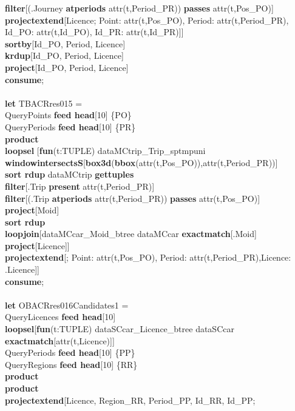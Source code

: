 \documentclass[a4paper]{article}
\newcommand{\op}[1]{\textbf{#1}}
\begin{document}
\begin{scriptsize}
\begin{tabbing}
\>\>\op{filter}[(.Journey \op{atperiods} attr(t,Period\_PR)) \op{passes} attr(t,Pos\_PO)]\\
\>\>\op{projectextend}[Licence; Point: attr(t,Pos\_PO), Period: attr(t,Period\_PR), Id\_PO: attr(t,Id\_PO), Id\_PR: attr(t,Id\_PR)]]\\
\>\op{sortby}[Id\_PO, Period, Licence]\\
\>\op{krdup}[Id\_PO, Period, Licence]\\
\>\op{project}[Id\_PO, Period, Licence]\\
\op{consume};\\
\\
\op{let} TBACRres015 =\\
\>QueryPoints  \op{feed head}[10] \{PO\}\\
\>QueryPeriods \op{feed head}[10] \{PR\}\\
\>\op{product}\\
\>\op{loopsel} [\op{fun}(t:TUPLE) dataMCtrip\_Trip\_sptmpuni \op{windowintersectsS}[\op{box3d}(\op{bbox}(attr(t,Pos\_PO)),attr(t,Period\_PR))]\\
\>\>\op{sort rdup} dataMCtrip \op{gettuples}\\
\>\>\op{filter}[.Trip \op{present} attr(t,Period\_PR)]\\
\>\>\op{filter}[(.Trip \op{atperiods} attr(t,Period\_PR)) \op{passes} attr(t,Pos\_PO)]\\
\>\>\op{project}[Moid]\\
\>\>\op{sort rdup}\\
\>\>\op{loopjoin}[dataMCcar\_Moid\_btree dataMCcar \op{exactmatch}[.Moid] \op{project}[Licence]]\\
\>\>\op{projectextend}[; Point: attr(t,Pos\_PO), Period: attr(t,Period\_PR),Licence: .Licence]]\\
\op{consume};\\
\\
\op{let} OBACRres016Candidates1 =\\
\>QueryLicences \op{feed head}[10]\\
\>\>\op{loopsel}[\op{fun}(t:TUPLE) dataSCcar\_Licence\_btree dataSCcar \op{exactmatch}[attr(t,Licence)]]\\
\>QueryPeriods \op{feed head}[10] \{PP\}\\
\>QueryRegions \op{feed head}[10] \{RR\}\\
\>\op{product}\\
\>\op{product}\\
\>\op{projectextend}[Licence, Region\_RR, Period\_PP, Id\_RR, Id\_PP;\\

\end{tabbing}
\end{scriptsize}
\end{document}
